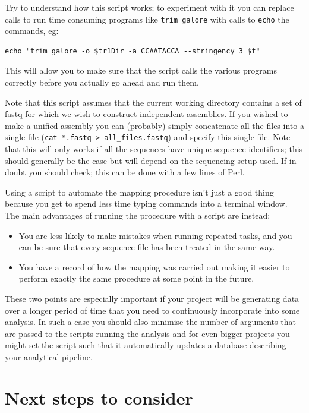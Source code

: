 \documentclass[11pt]{article}
\begin{document}
Try to understand how this script works; to experiment with it you
can replace calls to run time consuming programs like \texttt{trim\_galore} with calls
to \texttt{echo} the commands, eg:

\begin{verbatim}
echo "trim_galore -o $tr1Dir -a CCAATACCA --stringency 3 $f"
\end{verbatim}

This will allow you to make sure that the script calls the various
programs correctly before you actually go ahead and run them.

Note that this script assumes that the current working directory contains a set
of fastq for which we wish to construct independent assemblies. If you wished
to make a unified assembly you can (probably) simply concatenate all the files
into a single file (\texttt{cat *.fastq > all\_files.fastq}) and specify this single
file. Note that this will only works if all the sequences have unique sequence
identifiers; this should generally be the case but will depend on the sequencing
setup used. If in doubt you should check; this can be done with a few lines
of Perl.

Using a script to automate the mapping procedure isn't just a good thing
because you get to spend less time typing commands into a terminal window.
The main advantages of running the procedure with a script are instead:

\begin{itemize}
\item You are less likely to make mistakes when running repeated tasks, and
you can be sure that every sequence file has been treated in the same way.

\item You have a record of how the mapping was carried out making it easier to
perform exactly the same procedure at some point in the future.
\end{itemize}

These two points are especially important if your project will be generating
data over a longer period of time that you need to continuously incorporate
into some analysis. In such a case you should also minimise the number
of arguments that are passed to the scripts running the analysis and for
even bigger projects you might set the script such that it automatically updates
a database describing your analytical pipeline.

\section{Next steps to consider}
\label{sec-4}
\end{document}
